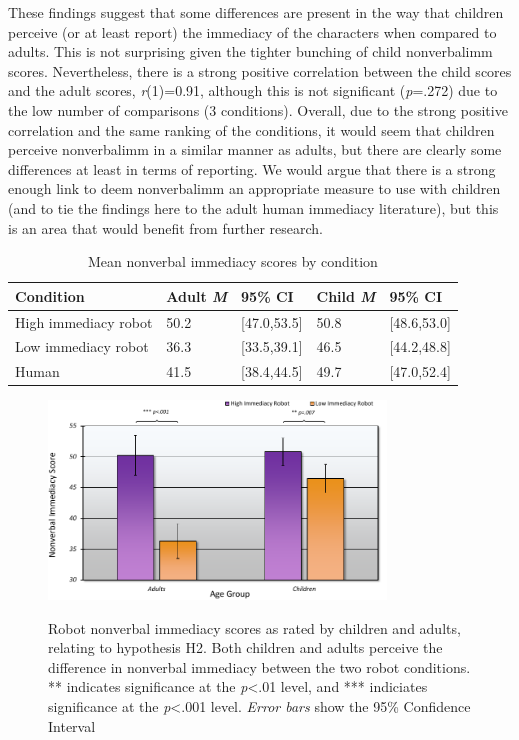 These findings suggest that some differences are present in the way that children perceive (or at least report) the \gls{immediacy} of the characters when compared to adults. This is not surprising given the tighter bunching of child \gls{nonverbalimm} scores. Nevertheless, there is a strong positive correlation between the child scores and the adult scores, \textit{r}(1)=0.91, although this is not significant (\textit{p}=.272) due to the low number of comparisons (3 conditions). Overall, due to the strong positive correlation and the same ranking of the conditions, it would seem that children perceive \gls{nonverbalimm} in a similar manner as adults, but there are clearly some differences at least in terms of reporting. We would argue that there is a strong enough link to deem \gls{nonverbalimm} an appropriate measure to use with children (and to tie the findings here to the adult human immediacy literature), but this is an area that would benefit from further research.

\begin{table}[t!]
	\centering
	\renewcommand{\arraystretch}{1.2} 
	\begin{tabular}{@{}lllll@{}}
	\toprule
	\textbf{Condition}			& \textbf{Adult \textit{M}}	& \textbf{95\% CI}	& \textbf{Child \textit{M}} 	& \textbf{95\% CI}	\\ \midrule
	High immediacy robot	& 50.2           				& [47.0,53.5]	& 50.8					& [48.6,53.0]		\\
	Low immediacy robot 	& 36.3 						& [33.5,39.1]	& 46.5					& [44.2,48.8]		\\
	Human								& 41.5						& [38.4,44.5]	& 49.7					& [47.0,52.4]		\\ \bottomrule
	\end{tabular}
	\caption{Mean nonverbal immediacy scores by condition}
	\label{table:ch4_immediacy}
\end{table}

\begin{figure}[t!]
	\centering
    \includegraphics[width=0.8\textwidth]{images/ch4_RobotImmGraph.pdf} \\
   \caption{Robot nonverbal immediacy scores as rated by children and adults, relating to hypothesis H2. Both children and adults perceive the difference in nonverbal immediacy between the two robot conditions. ** indicates significance at the \textit{p}\textless .01 level, and *** indiciates significance at the \textit{p}\textless .001 level. \textit{Error bars} show the 95\% Confidence Interval}
    \label{fig:ch4_immgraph}
\end{figure}

